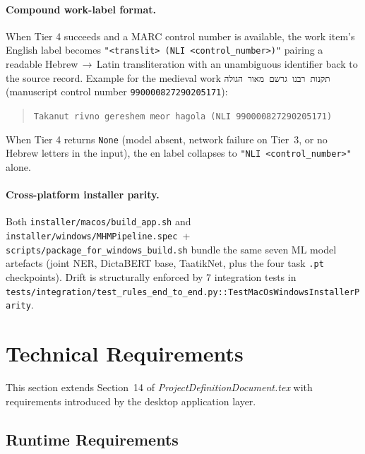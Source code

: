 \documentclass[12pt]{article}
\newcommand{\filepath}[1]{\texttt{\small #1}}
\newcommand{\code}[1]{\texttt{#1}}
\begin{document}
\paragraph{Compound work-label format.} When Tier 4 succeeds and a
MARC control number is available, the work item's English label
becomes \code{"\textless translit\textgreater{} (NLI
\textless control\_number\textgreater)"} \textemdash{} pairing a readable
Hebrew\,$\to$\,Latin transliteration with an unambiguous identifier
back to the source record. Example for the medieval work
\code{תקנות רבנו גרשם מאור הגולה} (manuscript control number
\code{990000827290205171}):
\begin{quote}
\code{Takanut rivno gereshem meor hagola (NLI 990000827290205171)}
\end{quote}
When Tier 4 returns \code{None} (model absent, network failure on
Tier~3, or no Hebrew letters in the input), the en label collapses to
\code{"NLI \textless control\_number\textgreater"} alone.

\paragraph{Cross-platform installer parity.} Both
\filepath{installer/macos/build\_app.sh} and
\filepath{installer/windows/MHMPipeline.spec}~+
\filepath{scripts/package\_for\_windows\_build.sh} bundle the same
seven ML model artefacts (joint NER, DictaBERT base, TaatikNet, plus
the four task \code{.pt} checkpoints). Drift is structurally enforced
by 7 integration tests in
\filepath{tests/integration/test\_rules\_end\_to\_end.py::TestMacOsWindowsInstallerParity}.

\section{Technical Requirements}
\label{sec:requirements}

This section extends Section~14 of \emph{ProjectDefinitionDocument.tex} with requirements introduced by the desktop application layer.

\subsection{Runtime Requirements}
\end{document}
